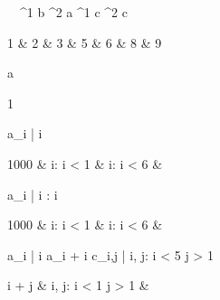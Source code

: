 \begin{eqcode}{\mu}{\ }{\ }{^1}
  b ^2 \lend
  a \in {}^1 \lend
  c \in {}^2 \lend
  c \gets \begin{tmatrix}
    1 & 2 & 3  & 5 & 6  & 8 & 9 \lend
  \end{tmatrix} \lend
   \lend
  a \gets 
  \begin{tmatrix}
    1   \lend
  \end{tmatrix} \lend
   \lend
  a_i | \forall i \gets 
  \begin{cases}
    1000 & i: i < 1  & i: i < 6  & \otherwise \lend
  \end{cases}\lend
   \lend
  a_i | i : i  \gets
  \begin{cases}
    1000 & i: i < 1  & i: i < 6  & \otherwise \lend
  \end{cases}\lend
   \lend
  a_i | \forall i \gets a_i  + i \lend
   \lend
  c_{i,j} | i, j: i < 5 \cap j > 1 \gets 
  \begin{cases}
    i + j & i, j: i < 1 \cap j > 1  & \otherwise \lend
  \end{cases} \lend
   \lend
   \lend
\end{eqcode}
